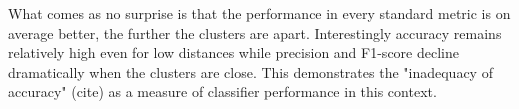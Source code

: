 What comes as no surprise is that the performance in every standard metric is on average better, the further the clusters are apart. 
Interestingly accuracy remains relatively high even for low distances while precision and F1-score decline dramatically when the clusters are close.
This demonstrates the "inadequacy of accuracy" (cite) as a measure of classifier performance in this context.























